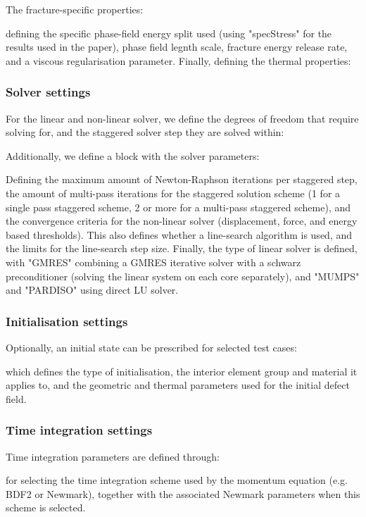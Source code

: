 \documentclass[3p]{elsarticle} %
\newcommand{\CodeSnipU}[4]{}
\begin{document}
The fracture-specific properties:
\CodeSnipU{TestCases/TriAxialCompression/TriAxial.json}{54}{59}{TestCases/TriAxialCompression/TriAxial.json}
defining the specific phase-field energy split used (using "specStress" for the results used in the paper), phase field legnth scale, fracture energy release rate, and a viscous regularisation parameter. Finally, defining the thermal properties:
\CodeSnipU{TestCases/TriAxialCompression/TriAxial.json}{60}{63}{TestCases/TriAxialCompression/TriAxial.json}

\subsubsection{Solver settings}
For the linear and non-linear solver, we define the degrees of freedom that require solving for, and the staggered solver step they are solved within:
\CodeSnipU{TestCases/TriAxialCompression/TriAxial.json}{72}{75}{TestCases/TriAxialCompression/TriAxial.json} 
Additionally, we define a block with the solver parameters:
\CodeSnipU{TestCases/TriAxialCompression/TriAxial.json}{76}{87}{TestCases/TriAxialCompression/TriAxial.json}
Defining the maximum amount of Newton-Raphson iterations per staggered step, the amount of multi-pass iterations for the staggered solution scheme (1 for a single pass staggered scheme, 2 or more for a multi-pass staggered scheme), and the convergence criteria for the non-linear solver (displacement, force, and energy based thresholds). This also defines whether a line-search algorithm is used, and the limits for the line-search step size. Finally, the type of linear solver is defined, with "GMRES" combining a GMRES iterative solver with a schwarz preconditioner (solving the linear system on each core separately), and "MUMPS" and "PARDISO" using direct LU solver.

\subsubsection{Initialisation settings}
Optionally, an initial state can be prescribed for selected test cases:
\CodeSnipU{TestCases/TriAxialCompression/TriAxial.json}{88}{96}{TestCases/TriAxialCompression/TriAxial.json}
which defines the type of initialisation, the interior element group and material it applies to, and the geometric and thermal parameters used for the initial defect field.

\subsubsection{Time integration settings}
Time integration parameters are defined through:
\CodeSnipU{TestCases/TriAxialCompression/TriAxial.json}{65}{70}{TestCases/TriAxialCompression/TriAxial.json}
for selecting the time integration scheme used by the momentum equation (e.g. BDF2 or Newmark), together with the associated Newmark parameters when this scheme is selected.
\end{document}
